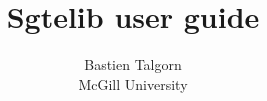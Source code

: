 \documentclass[12pt]{article}
\title{Sgtelib user guide}
\author{Bastien Talgorn\\
McGill University}
\begin{document}


\maketitle
\setlength{\parindent}{0pt}

\tableofcontents




\newcommand{\helpdivider}[1]{\section{#1}}
\newcommand{\itemname}[1]{\subsection{#1}}%


\end{document}
